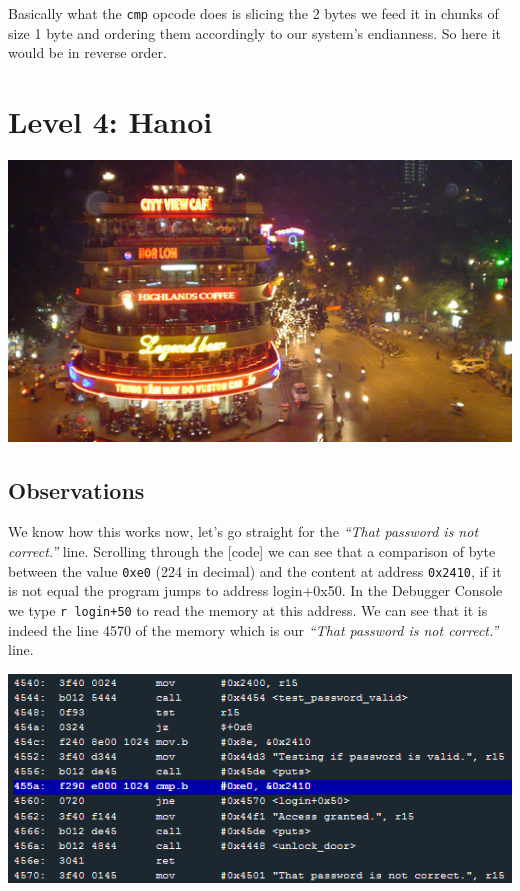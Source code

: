 \documentclass[a4paper,11pt]{article}
\begin{document}
Basically what the \texttt{cmp} opcode does is slicing the 2 bytes we
feed it in chunks of size 1 byte and ordering them accordingly to our
system's endianness. So here it would be in reverse order.

\section{Level 4: Hanoi}\label{level-4-hanoi}

\includegraphics{img/4_1.PNG}

\subsection{Observations}\label{observations-1}

We know how this works now, let's go straight for the \emph{``That
password is not correct.''} line. Scrolling through the {[}code{]} we
can see that a comparison of byte between the value \texttt{0xe0} (224
in decimal) and the content at address \texttt{0x2410}, if it is not
equal the program jumps to address login+0x50. In the Debugger Console
we type \texttt{r login+50} to read the memory at this address. We can
see that it is indeed the line 4570 of the memory which is our
\emph{``That password is not correct.''} line.

\includegraphics{img/3_1.PNG}
\end{document}
